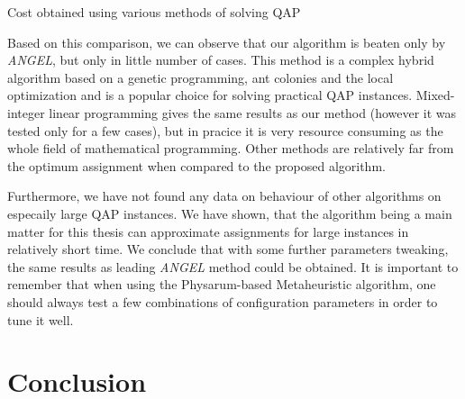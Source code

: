 \documentclass[english,a4paper,twoside]{ppfcmthesis}
\begin{document}
\begin{table}
  \centering
  \caption{Cost obtained using various methods of solving QAP \cite{tseng2006hybrid, karami2013analysis, ramakrishnan1998tight, maniezzo1999ant}}
  \label{table:result_comparison_cost}

\end{table}

Based on this comparison, we can observe that our algorithm is beaten only by \textit{ANGEL}, but only in little number of cases. This method is a complex hybrid algorithm based on a genetic programming, ant colonies and the local optimization and is a popular choice for solving practical QAP instances. Mixed-integer linear programming gives the same results as our method (however it was tested only for a few cases), but in pracice it is very resource consuming as the whole field of mathematical programming. Other methods are relatively far from the optimum assignment when compared to the proposed algorithm.

Furthermore, we have not found any data on behaviour of other algorithms on especaily large QAP instances. We have shown, that the algorithm being a main matter for this thesis can approximate assignments for large instances in relatively short time. We conclude that with some further parameters tweaking, the same results as leading \textit{ANGEL} method could be obtained. It is important to remember that when using the Physarum-based Metaheuristic algorithm, one should always test a few combinations of configuration parameters in order to tune it well.


\chapter{Conclusion}
\label{chapter:conclusion}
\end{document}
